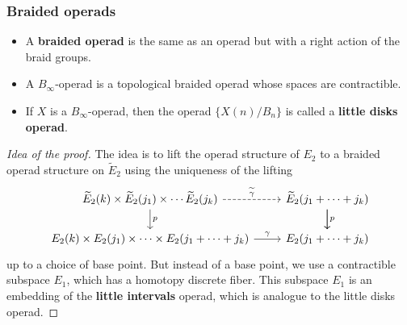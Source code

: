 \documentclass{beamer}
\theoremstyle{definition}
\newtheorem{prop}[teorema]{Proposition}
\begin{document}
 \begin{frame}
 	\frametitle{Braided operads}
 	\begin{itemize}
 		\item<1-> A \textbf{braided operad} is the same as an operad but with a right action of the braid groups. 
 		\item<2-> A $B_\infty$-operad is a topological braided operad whose spaces are contractible.
 		\item<3-> If $X$ is a $B_\infty$-operad, then the operad $\{X(n)/B_n\}$ is called a \textbf{little disks operad}.
 	\end{itemize}
 
 
\end{frame}


\begin{frame}[fragile]
	\begin{proof}[Idea of the proof]
		The idea is to lift the operad structure of $E_2$ to a braided operad structure on $\widetilde{E}_2$ using the uniqueness of the lifting 
		\[
		\begin{tikzcd}
		\widetilde{E}_2(k)\times\widetilde{E}_2(j_1)\times\cdots\widetilde{E}_2(j_k) \arrow[r, "\widetilde{\gamma}", dashed] \arrow[d, "p"] & \widetilde{E}_2(j_1+\cdots+j_k) \arrow[d, "p"] \arrow[d] \\
		E_2(k)\times E_2(j_1)\times\cdots\times E_2(j_1+\cdots+j_k) \arrow[r, "\gamma"]                                                                      & E_2(j_1+\cdots+j_k)                                     
		\end{tikzcd}
		\]
		up to a choice of base point. But instead of a base point, we use a contractible subspace $E_1$, which has a homotopy discrete fiber. This subspace $E_1$ is an embedding of the \textbf{little intervals} operad, which is analogue to the little disks operad. 
	\end{proof}
\end{frame}
\end{document}
